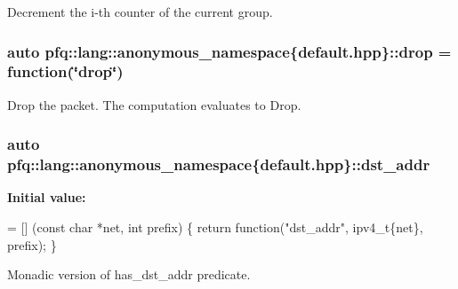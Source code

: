 Decrement the i-\/th counter of the current group. 

\subsubsection[{\texorpdfstring{drop}{drop}}]{\setlength{\rightskip}{0pt plus 5cm}auto pfq\+::lang\+::anonymous\+\_\+namespace\{default.\+hpp\}\+::drop = {\bf function}(\char`\"{}drop\char`\"{})}\hypertarget{namespacepfq_1_1lang_1_1anonymous__namespace_02default_8hpp_03_a0d715988e000ac6284a1615091eb4067}{}\label{namespacepfq_1_1lang_1_1anonymous__namespace_02default_8hpp_03_a0d715988e000ac6284a1615091eb4067}


Drop the packet. The computation evaluates to {\ttfamily Drop}. 

\subsubsection[{\texorpdfstring{dst\+\_\+addr}{dst_addr}}]{\setlength{\rightskip}{0pt plus 5cm}auto pfq\+::lang\+::anonymous\+\_\+namespace\{default.\+hpp\}\+::dst\+\_\+addr}\hypertarget{namespacepfq_1_1lang_1_1anonymous__namespace_02default_8hpp_03_a3f51de44baa33ff19a94995945636072}{}\label{namespacepfq_1_1lang_1_1anonymous__namespace_02default_8hpp_03_a3f51de44baa33ff19a94995945636072}
{\bfseries Initial value\+:}
\begin{DoxyCode}
= [] (\textcolor{keyword}{const} \textcolor{keywordtype}{char} *net, \textcolor{keywordtype}{int} prefix)
        \{
            \textcolor{keywordflow}{return} \textcolor{keyword}{function}(\textcolor{stringliteral}{"dst\_addr"}, ipv4\_t\{net\}, prefix);
        \}
\end{DoxyCode}


Monadic version of {\ttfamily has\+\_\+dst\+\_\+addr} predicate. 

